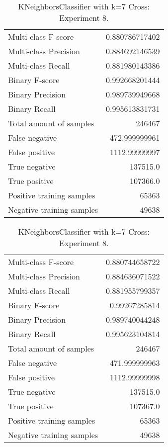 \begin{table}[H]
\begin{minipage}{0.5\textwidth}
\caption{KNeighborsClassifier with k=7 Cross: Experiment 7.}
\centering
\begin{tabular}{l r}
\toprule
Multi-class F-score & 0.880786717402 \\
Multi-class Precision & 0.884692146539 \\
Multi-class Recall & 0.881980143386 \\
\midrule
Binary F-score & 0.992668201444 \\
Binary Precision & 0.989739949668 \\
Binary Recall & 0.995613831731 \\
\midrule
Total amount of samples & 246467 \\
False negative & 472.999999961 \\
False positive & 1112.99999997 \\
True negative & 137515.0 \\
True positive & 107366.0 \\
\midrule
Positive training samples & 65363 \\
Negative training samples & 49638 \\
\bottomrule
\end{tabular}
\end{minipage}
\hfillx
\begin{minipage}{0.5\textwidth}
\caption{KNeighborsClassifier with k=7 Cross: Experiment 8.}
\centering
\begin{tabular}{l r}
\toprule
Multi-class F-score & 0.880744658722 \\
Multi-class Precision & 0.884636071522 \\
Multi-class Recall & 0.881955799357 \\
\midrule
Binary F-score & 0.99267285814 \\
Binary Precision & 0.989740044248 \\
Binary Recall & 0.995623104814 \\
\midrule
Total amount of samples & 246467 \\
False negative & 471.999999963 \\
False positive & 1112.99999998 \\
True negative & 137515.0 \\
True positive & 107367.0 \\
\midrule
Positive training samples & 65363 \\
Negative training samples & 49638 \\
\bottomrule
\end{tabular}
\end{minipage}
\end{table}
